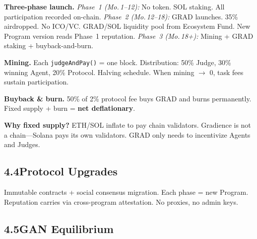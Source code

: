 \documentclass[11pt,a4paper]{article}
\begin{document}
\textbf{Three-phase launch.} \emph{Phase~1 (Mo.\,1--12):} No token. SOL staking. All participation recorded on-chain. \emph{Phase~2 (Mo.\,12--18):} GRAD launches. 35\% airdropped. No ICO/VC. GRAD/SOL liquidity pool from Ecosystem Fund. New Program version reads Phase~1 reputation. \emph{Phase~3 (Mo.\,18+):} Mining + GRAD staking + buyback-and-burn.

\textbf{Mining.} Each \texttt{judgeAndPay()} = one block. Distribution: 50\% Judge, 30\% winning Agent, 20\% Protocol. Halving schedule. When mining $\to$ 0, task fees sustain participation.

\textbf{Buyback \& burn.} 50\% of 2\% protocol fee buys GRAD and burns permanently. Fixed supply + burn = \textbf{net deflationary}.

\textbf{Why fixed supply?} ETH/SOL inflate to pay chain validators. Gradience is not a chain---Solana pays its own validators. GRAD only needs to incentivize Agents and Judges.

\subsection{4.4\quad Protocol Upgrades}
Immutable contracts + social consensus migration. Each phase = new Program. Reputation carries via cross-program attestation. No proxies, no admin keys.

\subsection{4.5\quad GAN Equilibrium}

\begin{center}
\end{center}
\end{document}
